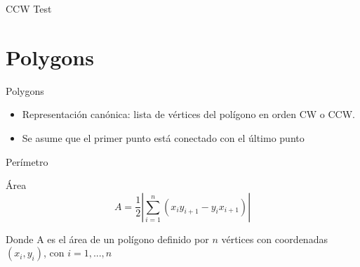 \documentclass[]{beamer}
\begin{document}
\begin{frame}{CCW Test}
  
\end{frame}

\section{Polygons}
\begin{frame}{Polygons}
  \begin{itemize}
    \item Representaci\'on can\'onica: lista de v\'ertices del pol\'igono en orden CW o CCW.
      \pause
    \item Se asume que el primer punto est\'a conectado con el \'ultimo punto
  \end{itemize}
\end{frame}

\begin{frame}{Per\'imetro}
  
\end{frame}

\begin{frame}{\'Area}
\[
A = \frac{1}{2} \left| \sum_{i=1}^{n} (x_i y_{i+1} - y_i x_{i+1}) \right|
\]

  Donde A es el \'area de un pol\'igono definido por $n$ v\'ertices con coordenadas $(x_i, y_i)$, con $i=1, ..., n$
\end{frame}
\end{document}
